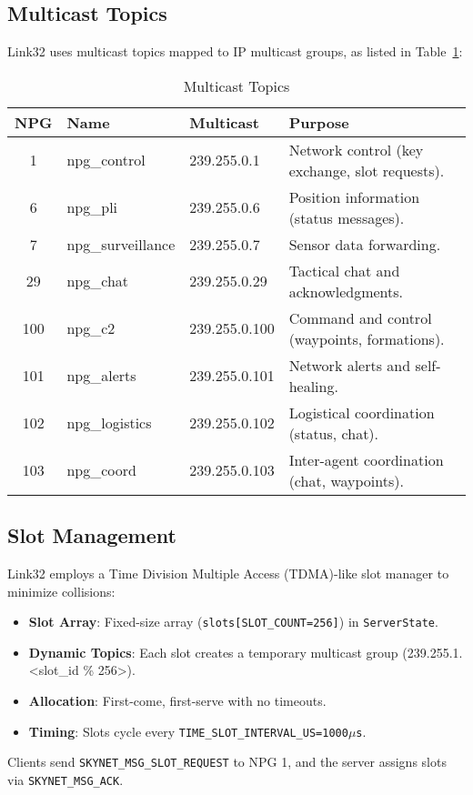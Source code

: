 \documentclass{article}
\begin{document}
\subsection{Multicast Topics}
Link32 uses multicast topics mapped to IP multicast groups, as listed in Table~\ref{tab:topics}:
\begin{table}[h]
\centering
\caption{Multicast Topics}
\label{tab:topics}
\begin{tabular}{cllp{5cm}}
\hline
\textbf{NPG} & \textbf{Name} & \textbf{Multicast} & \textbf{Purpose} \\
\hline
1 & npg\_control & 239.255.0.1 & Network control (key exchange, slot requests). \\
6 & npg\_pli & 239.255.0.6 & Position information (status messages). \\
7 & npg\_surveillance & 239.255.0.7 & Sensor data forwarding. \\
29 & npg\_chat & 239.255.0.29 & Tactical chat and acknowledgments. \\
100 & npg\_c2 & 239.255.0.100 & Command and control (waypoints, formations). \\
101 & npg\_alerts & 239.255.0.101 & Network alerts and self-healing. \\
102 & npg\_logistics & 239.255.0.102 & Logistical coordination (status, chat). \\
103 & npg\_coord & 239.255.0.103 & Inter-agent coordination (chat, waypoints). \\
\hline
\end{tabular}
\end{table}

\subsection{Slot Management}
Link32 employs a Time Division Multiple Access (TDMA)-like slot manager to minimize collisions:
\begin{itemize}
    \item \textbf{Slot Array}: Fixed-size array (\texttt{slots[SLOT\_COUNT=256]}) in
          \texttt{ServerState}.
    \item \textbf{Dynamic Topics}: Each slot creates a temporary multicast group
          (239.255.1.<slot\_id \% 256>).
    \item \textbf{Allocation}: First-come, first-serve with no timeouts.
    \item \textbf{Timing}: Slots cycle every \texttt{TIME\_SLOT\_INTERVAL\_US=1000$\mu$s}.
\end{itemize}
Clients send \texttt{SKYNET\_MSG\_SLOT\_REQUEST} to NPG 1, and the server assigns slots via
\texttt{SKYNET\_MSG\_ACK}.
\end{document}
